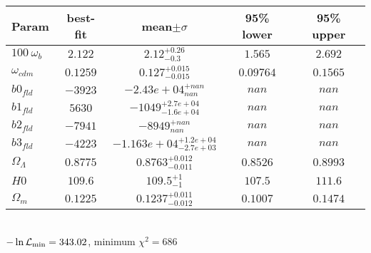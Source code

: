 \begin{tabular}{|l|c|c|c|c|} 
 \hline 
Param & best-fit & mean$\pm\sigma$ & 95\% lower & 95\% upper \\ \hline 
$100~\omega_{b }$ &$2.122$ & $2.12_{-0.3}^{+0.26}$ & $1.565$ & $2.692$ \\ 
$\omega_{cdm }$ &$0.1259$ & $0.127_{-0.015}^{+0.015}$ & $0.09764$ & $0.1565$ \\ 
$b0_{fld }$ &$-3923$ & $-2.43e+04_{nan}^{+nan}$ & $nan$ & $nan$ \\ 
$b1_{fld }$ &$5630$ & $-1049_{-1.6e+04}^{+2.7e+04}$ & $nan$ & $nan$ \\ 
$b2_{fld }$ &$-7941$ & $-8949_{nan}^{+nan}$ & $nan$ & $nan$ \\ 
$b3_{fld }$ &$-4223$ & $-1.163e+04_{-2.7e+03}^{+1.2e+04}$ & $nan$ & $nan$ \\ 
$\Omega_{\Lambda }$ &$0.8775$ & $0.8763_{-0.011}^{+0.012}$ & $0.8526$ & $0.8993$ \\ 
$H0$ &$109.6$ & $109.5_{-1}^{+1}$ & $107.5$ & $111.6$ \\ 
$\Omega_{m }$ &$0.1225$ & $0.1237_{-0.012}^{+0.011}$ & $0.1007$ & $0.1474$ \\ 
\hline 
 \end{tabular} \\ 
$-\ln{\cal L}_\mathrm{min} =343.02$, minimum $\chi^2=686$ \\ 
